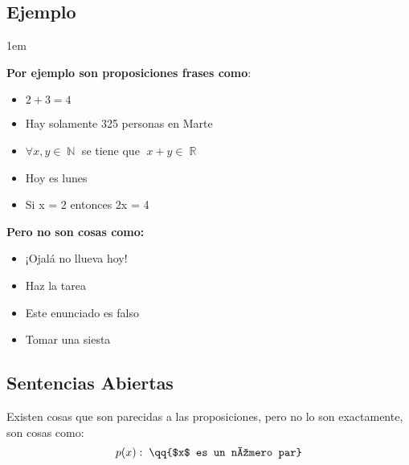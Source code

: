 \documentclass[12pt, fleqn]{report}                             %
\newcommand \Quote {\qq}                                        %
\newenvironment{SmallIndentation}[1][0.75em]                    %
    {\begin{adjustwidth}{#1}{}\begin{footnotesize}}                 %
    {\end{footnotesize}\end{adjustwidth}}                           %
\DeclareMathOperator \Naturals  {\mathbb{N}}                     %
\DeclareMathOperator \Reals     {\mathbb{R}}                     %
\begin{document}
                \subsection*{Ejemplo}
                    
                    \begin{multicols}{2}
                    \begin{SmallIndentation}[1em]
                        \textbf{Por ejemplo son proposiciones frases como}:
                        \begin{itemize}
                            \item $2 + 3 = 4$
                            \item Hay solamente 325 personas en Marte
                            \item $\forall x, y \in \Naturals$ se tiene que $\; x+y \in \Reals$
                            \item Hoy es lunes
                            \item Si x = 2 entonces 2x = 4
                        \end{itemize}

                        \textbf{Pero no son cosas como:}
                        \begin{itemize}
                            \item ¡Ojalá no llueva hoy!
                            \item Haz la tarea
                            \item Este enunciado es falso
                            \item Tomar una siesta
                        \end{itemize}
                    
                    \end{SmallIndentation}
                    \end{multicols}



            \clearpage
            \subsection{Sentencias Abiertas}
                Existen cosas que son parecidas a las proposiciones, pero no lo son exactamente,
                son cosas como:
                \begin{equation*}
                    p(x): \; \text{\Quote{$x$ es un número par}}  
                \end{equation*}
\end{document}
